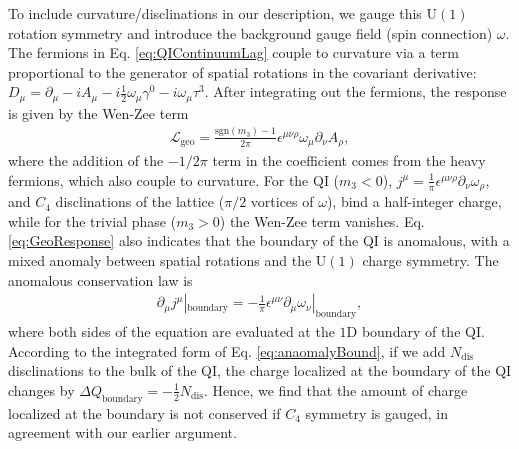 \documentclass[%
 reprint,
 amsmath,amssymb,
 aps,
]{revtex4-1}
\begin{document}
To include curvature/disclinations in our description, we gauge this U$(1)$ rotation symmetry and introduce the background gauge field (spin connection) $\omega$\cite{lawrie2012unified}. The fermions in Eq. \ref{eq:QIContinuumLag} couple to curvature via a term proportional to the generator of spatial rotations in the covariant derivative: $D_\mu = \partial_\mu - i A_\mu - i\frac{1}{2}\omega_\mu \gamma^0 - i\omega_\mu\tau^3$. After integrating out the fermions, the response is given by the Wen-Zee term
\begin{equation}\begin{split}
\mathcal{L}_{\text{geo}} = \frac{\text{sgn}(m_3)-1}{2\pi}\epsilon^{\mu\nu\rho} \omega_\mu \partial_\nu A_\rho, 
\label{eq:GeoResponse}
\end{split}\end{equation}
where the addition of the $-1/2\pi$ term in the coefficient comes from the heavy fermions, which also couple to curvature. For the QI ($m_3 < 0$), $j^\mu = \frac{1}{\pi} \epsilon^{\mu\nu\rho} \partial_\nu \omega_\rho$, and $C_4$ disclinations of the lattice ($\pi/2$ vortices of $\omega$), bind a half-integer charge, while for the trivial phase ($m_3 > 0$) the Wen-Zee term vanishes. Eq. \ref{eq:GeoResponse} also indicates that the boundary of the QI is anomalous, with a mixed anomaly between spatial rotations and the U$(1)$ charge symmetry. The anomalous conservation law is
\begin{equation}\begin{split}
 \partial_\mu j^\mu |_{\text{boundary}} = -\frac{1}{\pi}\epsilon^{\mu\nu} \partial_\mu \omega_\nu|_{\text{boundary}},
 \label{eq:anaomalyBound}\end{split}\end{equation}
 where both sides of the equation are evaluated at the $1$D boundary of the QI. According to the integrated form of Eq. \ref{eq:anaomalyBound}, if we add $N_{\text{dis}}$ disclinations to the bulk of the QI, the charge localized at the boundary of the QI changes by $\Delta Q_{\text{boundary}} = -\frac{1}{2} N_{\text{dis}}$. Hence, we find that the amount of charge localized at the boundary is not conserved if $C_4$ symmetry is gauged, in agreement with our earlier argument. 
\end{document}

